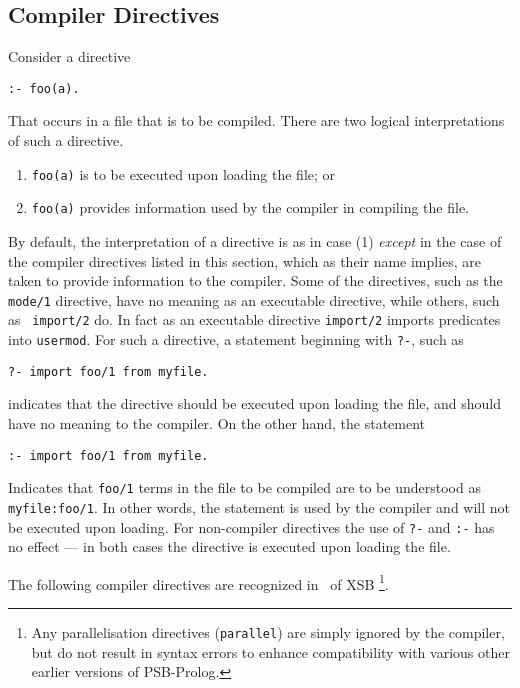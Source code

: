 \subsection{Compiler Directives}\label{compiler_directives}

Consider a directive
\begin{verbatim}
:- foo(a).
\end{verbatim}
That occurs in a file that is to be compiled.  There are two logical
interpretations of such a directive.
\begin{enumerate}
\item {\tt foo(a)} is to be executed upon loading the file; or
%
\item{\tt foo(a)} provides information used by the compiler in
compiling the file. 
\end{enumerate}

By default, the interpretation of a directive is as in case (1) {\em
except} in the case of the compiler directives listed in this section,
which as their name implies, are taken to provide information to the
compiler.  Some of the directives, such as the {\tt mode/1} directive,
have no meaning as an executable directive, while others, such as {\tt
import/2} do.  In fact as an executable directive {\tt import/2}
imports predicates into {\tt usermod}.  For such a directive, a 
statement beginning with {\tt ?-}, such as 
\begin{verbatim}
?- import foo/1 from myfile.
\end{verbatim}
indicates that the directive should be executed upon loading the file,
and should have no meaning to the compiler.  On the other hand, the
statement
\begin{verbatim}
:- import foo/1 from myfile.
\end{verbatim}
Indicates that {\tt foo/1} terms in the file to be compiled are to be
understood as {\tt myfile:foo/1}.  In other words, the statement is
used by the compiler and will not be executed upon loading.  For
non-compiler directives the use of {\tt ?-} and {\tt :-} has no effect
--- in both cases the directive is executed upon loading the file.

The following compiler directives are recognized in \version\ of XSB
\footnote{Any parallelisation directives ({\tt parallel}) are simply
ignored by the compiler, but do not result in syntax errors to enhance
compatibility with various other earlier versions of PSB-Prolog.}.

